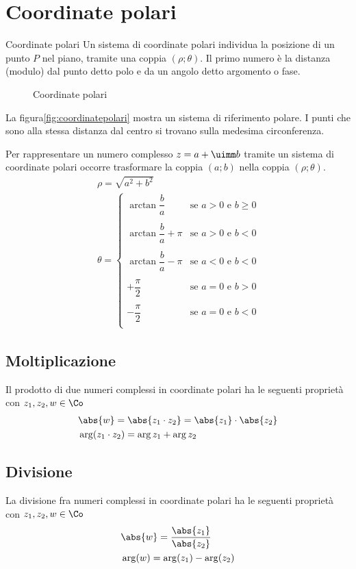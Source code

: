 \section{Coordinate polari}
\begin{definizionet}{Coordinate polari}{}
Un sistema di coordinate polari individua la posizione di un punto $P$ nel piano, tramite una coppia $(\rho;\theta)$.  Il primo numero è la distanza (modulo) dal punto detto polo e da un angolo detto argomento o fase.
\end{definizionet}
\begin{figure} %
	\centering

	\caption{Coordinate polari}
	\label{fig:coordinatepolari}
\end{figure}
La figura\nobs\vref{fig:coordinatepolari} mostra un sistema di riferimento polare. I punti che sono alla stessa distanza dal centro si trovano sulla medesima circonferenza. 

Per rappresentare un numero complesso $z=a+\uimm b$ tramite un sistema di coordinate polari occorre trasformare la coppia $(a;b)$
nella coppia $(\rho;\theta)$.
\begin{align*}
&\rho=\sqrt{a^2+b^2}\\
&\theta=\begin{cases}
\arctan{\dfrac{b}{a}}&\text{se $a>0$ e $b\geq 0$ }\\
&\\
\arctan{\dfrac{b}{a}}+\pi&\text{se $a>0$ e $b< 0$ }\\
&\\
\arctan{\dfrac{b}{a}}-\pi&\text{se $a<0$ e $b< 0$ }\\
&\\
+\dfrac{\pi}{2}&\text{se $a=0$ e $b> 0$ }\\
&\\
-\dfrac{\pi}{2}&\text{se $a=0$ e $b< 0$ }\\
\end{cases}
\end{align*} 
\subsection{Moltiplicazione}
Il prodotto di due numeri complessi in coordinate polari ha le seguenti proprietà  con $z_1,z_2,w\in \Co$ 
\begin{align*}
&\abs{w}=\abs{z_1\cdot z_2}=\abs{z_1}\cdot\abs{z_2}\\
&\arg(z_1\cdot z_2)=\arg{z_1}+\arg{z_2}
\end{align*} 
\subsection{Divisione}
La divisione fra numeri complessi in coordinate polari ha le seguenti proprietà con $z_1,z_2,w\in \Co$ 
\begin{align*}
&\abs{w}=\dfrac{\abs{z_1}}{\abs{z_2}}\\
&\arg(w)=\arg (z_1)-\arg (z_2)
\end{align*}
